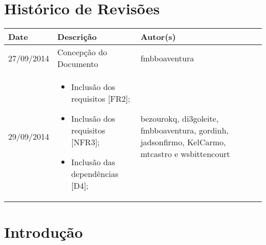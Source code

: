 \documentclass{article}
\begin{document}

\capa
\newpage

\section*{\center Histórico de Revisões}
  \vspace*{1cm}
  \begin{table}[ht]
    \centering
    \begin{tabular}[pos]{|m{2cm} | m{7.2cm} | m{3.8cm}|} 
      \hline
      \cellcolor[gray]{0.9}
      \textbf{Date} & \cellcolor[gray]{0.9}\textbf{Descrição} & \cellcolor[gray]{0.9}\textbf{Autor(s)}\\ \hline
      \hline
      \small 27/09/2014 & \small Concepção do Documento & \small fmbboaventura \\ \hline      
      \small 29/09/2014 &
      \begin{small}
        \begin{itemize}
          \item Inclusão dos requisitos [FR2];
          \item Inclusão dos requisitos [NFR3];
          \item Inclusão das dependências [D4];
        \end{itemize}
      \end{small} & \small bezourokq, di3goleite, fmbboaventura, gordinh, jadsonfirmo, KelCarmo, mtcastro e wsbittencourt \\ \hline 
    \end{tabular}
  \end{table}

\newpage

\tableofcontents
\newpage

\section{Introdução}
\end{document}
